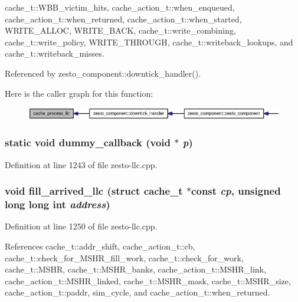 cache\_\-t::WBB\_\-victim\_\-hits, cache\_\-action\_\-t::when\_\-enqueued, cache\_\-action\_\-t::when\_\-returned, cache\_\-action\_\-t::when\_\-started, WRITE\_\-ALLOC, WRITE\_\-BACK, cache\_\-t::write\_\-combining, cache\_\-t::write\_\-policy, WRITE\_\-THROUGH, cache\_\-t::writeback\_\-lookups, and cache\_\-t::writeback\_\-misses.

Referenced by zesto\_\-component::downtick\_\-handler().

Here is the caller graph for this function:\nopagebreak
\begin{figure}[H]
\begin{center}
\leavevmode
\includegraphics[width=320pt]{zesto-llc_8cpp_7b2967a29a17913e313fceec0d9dbd4c_icgraph}
\end{center}
\end{figure}
\subsubsection[{dummy\_\-callback}]{\setlength{\rightskip}{0pt plus 5cm}static void dummy\_\-callback (void $\ast$ {\em p})\hspace{0.3cm}{\tt  [static]}}\label{zesto-llc_8cpp_2ca1ae8eb0053c08276d5e170a5f98d8}




Definition at line 1243 of file zesto-llc.cpp.
\subsubsection[{fill\_\-arrived\_\-llc}]{\setlength{\rightskip}{0pt plus 5cm}void fill\_\-arrived\_\-llc (struct {\bf cache\_\-t} $\ast$const  {\em cp}, \/  unsigned long long int {\em address})}\label{zesto-llc_8cpp_f1f903df28f067bfd63f3145c04a5870}




Definition at line 1250 of file zesto-llc.cpp.

References cache\_\-t::addr\_\-shift, cache\_\-action\_\-t::cb, cache\_\-t::check\_\-for\_\-MSHR\_\-fill\_\-work, cache\_\-t::check\_\-for\_\-work, cache\_\-t::MSHR, cache\_\-t::MSHR\_\-banks, cache\_\-action\_\-t::MSHR\_\-link, cache\_\-action\_\-t::MSHR\_\-linked, cache\_\-t::MSHR\_\-mask, cache\_\-t::MSHR\_\-size, cache\_\-action\_\-t::paddr, sim\_\-cycle, and cache\_\-action\_\-t::when\_\-returned.

